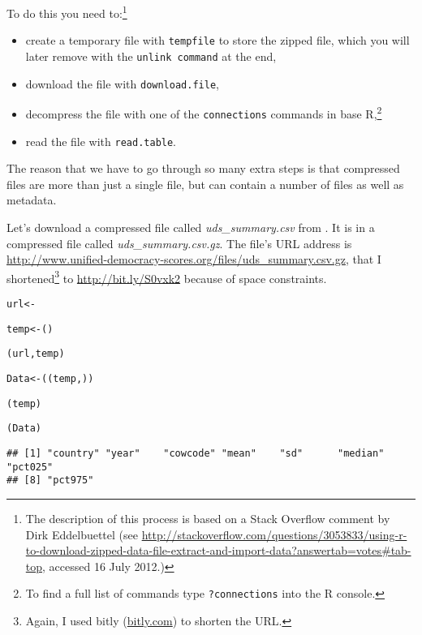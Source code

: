 To do this you need to:\footnote{The description of this process is based on a Stack Overflow comment by Dirk Eddelbuettel (see {\url{http://stackoverflow.com/questions/3053833/using-r-to-download-zipped-data-file-extract-and-import-data?answertab=votes\#tab-top}}, accessed 16 July 2012.)}

\begin{itemize}
	\item create a temporary file with {\tt{tempfile}} to store the zipped file, which you will later remove with the {\tt{unlink command}} at the end,
	\item download the file with {\tt{download.file}},
	\item decompress the file with one of the {\tt{connections}} commands in base R,\footnote{To find a full list of commands type {\tt{?connections}} into the R console.}
	\item read the file with {\tt{read.table}}. 
\end{itemize}

\noindent The reason that we have to go through so many extra steps is that compressed files are more than just a single file, but can contain a number of files as well as metadata.

Let's download a compressed file called {\emph{uds\_summary.csv}} from \cite{Pemstein2010}. It is in a compressed file called {\emph{uds\_summary.csv.gz}}. The file's URL address is {\url{http://www.unified-democracy-scores.org/files/uds_summary.csv.gz}}, that I shortened\footnote{Again, I used bitly (\url{bitly.com}) to shorten the URL.} to \url{http://bit.ly/S0vxk2} because of space constraints.

{\scriptsize
\begin{knitrout}
\color{fgcolor}\begin{kframe}
\begin{alltt}
url <- 

temp <- ()

(url, temp)

Data <- ((temp, ))

(temp)

(Data)
\end{alltt}
\begin{verbatim}
## [1] "country" "year"    "cowcode" "mean"    "sd"      "median"  "pct025" 
## [8] "pct975"
\end{verbatim}
\end{kframe}
\end{knitrout}

}

